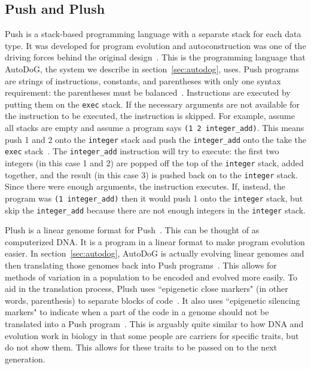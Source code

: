 \documentclass{sig-alternate}
\begin{document}
\subsection{Push and Plush}
\label{sec:push}

Push is a stack-based programming language with a separate stack for each data type. It was developed for program evolution and autoconstruction was one of the driving forces behind the original design~\cite{spector:2016}. This is the programming language that AutoDoG, the system we describe in section~\ref{sec:autodog}, uses. Push programs are strings of instructions, constants, and parentheses with only one syntax requirement: the parentheses must be balanced~\cite{lee:2001}. Instructions are executed by putting them on the \texttt{exec} stack. If the necessary arguments are not available for the instruction to be executed, the instruction is skipped. For example, assume all stacks are empty and assume a program says \texttt{(1 2 integer\_add)}. This means push 1 and 2 onto the \texttt{integer} stack and push the \texttt{integer\_add} onto the take the \texttt{exec} stack~\cite{lee:tutorial}. The \texttt{integer\_add} instruction will try to execute: the first two integers (in this case 1 and 2)  are popped off the top of the \texttt{integer} stack, added together, and the result (in this case 3) is pushed back on to the \texttt{integer} stack. Since there were enough arguments, the instruction executes. If, instead, the program was \texttt{(1 integer\_add)} then it would push 1 onto the \texttt{integer} stack, but skip the \texttt{integer\_add} because there are not enough integers in the \texttt{integer} stack.

Plush is a linear genome format for Push~\cite{spector:2016}. This can be thought of as computerized DNA. It is a program in a linear format to make program evolution easier.
In section~\ref{sec:autodog}, AutoDoG is actually evolving linear genomes and then translating those genomes back into Push programs~\cite{spector:2016}. This allows for methods of variation in a population to be encoded and evolved more easily. To aid in the translation process, Plush uses ``epigenetic close markers" (in other words, parenthesis) to separate blocks of code~\cite{spector:2016}. It also uses ``epigenetic silencing markers" to indicate when a part of the code in a genome should not be translated into a Push program~\cite{spector:2016}. This is arguably quite similar to how DNA and evolution work in biology in that some people are carriers for specific traits, but do not show them. This allows for these traits to be passed on to the next generation.
\end{document}
